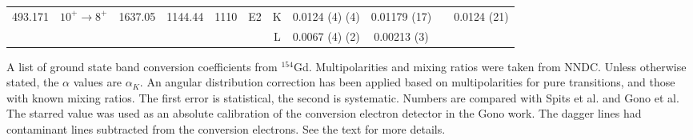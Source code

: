 \begin{landscape}
\begin{longtable}{c|c|c|c|c|c|c|c|c|c|c}
	    \hline
        493.171	&	$10^+	\rightarrow	8^+$	&	1637.05	&	1144.44	&	1110	&	E2	& K	&	0.0124	(4) (4)	&	0.01179 (17)	& &	0.0124 (21)	\\
	    &				&		&		&		&	& L	&	0.0067	(4) (2)	&	0.00213 (3)	&		\\
        \bottomrule
    \end{longtable}
    \item{A list of ground state band conversion coefficients from $^{154}$Gd. Multipolarities and mixing ratios were taken from NNDC. Unless otherwise stated, the $\alpha$ values are $\alpha_K$. An angular distribution correction has been applied based on multipolarities for pure transitions, and those with known mixing ratios. The first error is statistical, the second is systematic. Numbers are compared with Spits et al.\citep{spits96:_154gd} and Gono et al.\citep{gono74:_154gd_e0} The starred value was used as an absolute calibration of the conversion electron detector in the Gono work. The dagger lines had contaminant lines subtracted from the conversion electrons. See the text for more details.}
\end{landscape}